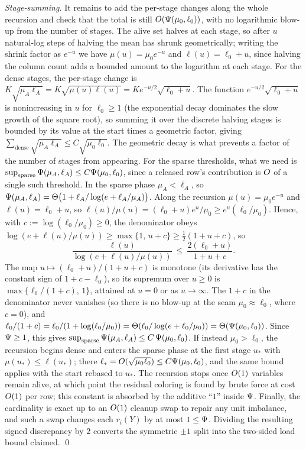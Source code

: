 \emph{Stage-summing.} It remains to add the per-stage changes along the whole recursion and check that the total is still
$O(\Psi(\mu_0,\ell_0))$, with no logarithmic blow-up from the number of stages. The alive set halves at each stage, so
after $u$ natural-log steps of halving the mean has shrunk geometrically; writing the shrink factor as $e^{-u}$ we have
$\mu(u)=\mu_0 e^{-u}$ and $\ell(u)=\ell_0+u$, since halving the column count adds a bounded amount to the logarithm at each
stage. For the dense stages, the per-stage change is $K\sqrt{\mu_A\ell_A}=K\sqrt{\mu(u)\ell(u)}=K e^{-u/2}\sqrt{\ell_0+u}$.
The function $e^{-u/2}\sqrt{\ell_0+u}$ is nonincreasing in $u$ for $\ell_0\ge 1$ (the exponential decay dominates the slow
growth of the square root), so summing it over the discrete halving stages is bounded by its value at the start times a
geometric factor, giving $\sum_{\text{dense}}\sqrt{\mu_A\ell_A}\le C\sqrt{\mu_0\ell_0}$. The geometric decay is what
prevents a factor of the number of stages from appearing. For the sparse thresholds, what we need is
$\sup_{\text{sparse}}\Psi(\mu_A,\ell_A)\le C\Psi(\mu_0,\ell_0)$, since a released row's contribution is $O$ of a single
such threshold. In the sparse phase $\mu_A<\ell_A$, so $\Psi(\mu_A,\ell_A)=\Theta\big(1+\ell_A/\log(e+\ell_A/\mu_A)\big)$. Along the recursion
$\mu(u)=\mu_0 e^{-u}$ and $\ell(u)=\ell_0+u$, so $\ell(u)/\mu(u)=(\ell_0+u)e^{u}/\mu_0\ge e^{u}(\ell_0/\mu_0)$. Hence, with
$c:=\log(\ell_0/\mu_0)\ge0$, the denominator obeys $\log(e+\ell(u)/\mu(u))\ge\max\{1,\,u+c\}\ge\tfrac12(1+u+c)$, so
\[
  \frac{\ell(u)}{\log(e+\ell(u)/\mu(u))}\ \le\ \frac{2(\ell_0+u)}{\,1+u+c\,}.
\]
The map $u\mapsto(\ell_0+u)/(1+u+c)$ is monotone (its derivative has the constant sign of $1+c-\ell_0$), so its supremum over
$u\ge0$ is $\max\{\ell_0/(1+c),\,1\}$, attained at $u=0$ or as $u\to\infty$. The $1+c$ in the denominator never vanishes (so
there is no blow-up at the seam $\mu_0\approx\ell_0$, where $c=0$), and $\ell_0/(1+c)=\ell_0/(1+\log(\ell_0/\mu_0))=\Theta(\ell_0/\log(e+\ell_0/\mu_0))=\Theta(\Psi(\mu_0,\ell_0))$.
Since $\Psi\ge1$, this gives $\sup_{\text{sparse}}\Psi(\mu_A,\ell_A)\le C\,\Psi(\mu_0,\ell_0)$. If instead $\mu_0>\ell_0$, the recursion begins dense
and enters the sparse phase at the first stage $u_*$ with $\mu(u_*)\le\ell(u_*)$; there $\ell_{*}=O(\sqrt{\mu_0\ell_0})\le
C\Psi(\mu_0,\ell_0)$, and the same bound applies with the start rebased to $u_*$. The recursion stops once $O(1)$ variables remain alive, at which point the residual
coloring is found by brute force at cost $O(1)$ per row; this constant is absorbed by the additive ``$1$'' inside
$\Psi$. Finally, the cardinality is exact up to an $O(1)$ cleanup swap to repair any unit imbalance, and such a swap
changes each $r_i(Y)$ by at most $1\le\Psi$. Dividing the resulting signed discrepancy by $2$ converts the symmetric
$\pm1$ split into the two-sided load bound claimed. \qed

